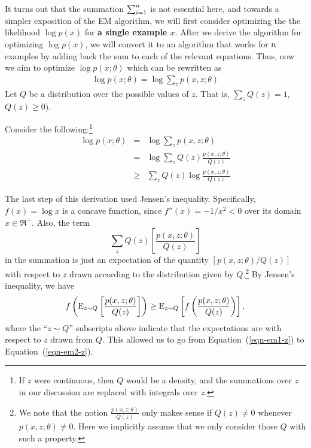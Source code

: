 \documentclass{article}
\begin{document}
It turns out that the summation $\sum_{i=1}^{n}$ is not essential here, and towards a simpler exposition of the EM algorithm, we will first consider optimizing the the likelihood $\log p(x)$ for {\bf a single example $x$}. After we derive the algorithm for optimizing $\log p(x)$, we will convert it to an algorithm that works for ${n}$ examples by adding back the sum to each of the relevant equations. Thus, now we aim to optimize $\log p(x;\theta)$ which can be rewritten as
\begin{align}
\log p(x;\theta) = \log \sum_z p(x,z; \theta)
\end{align}
Let $Q$ be a distribution over the possible values of $z$.  That is, $\sum_z Q(z) = 1$, $Q(z) \geq 0$). 

Consider the following:\footnote{If $z$ were continuous, then $Q$
	would be a density, and the summations over $z$ in our discussion
	are replaced with integrals over $z$.}
\begin{eqnarray}
\log p(x; \theta)
&=&  \log \sum_{z} p(x, z; \theta) \nonumber\\
&=& \log \sum_{z} Q(z) \frac{p(x, z; \theta)}{Q(z)} \label{eqn-em1-z}\\
&\geq&  \sum_{z} Q(z) \log \frac{p(x, z; \theta)}{Q(z)} \label{eqn-em2-z}
\end{eqnarray}



The last step of this derivation used Jensen's inequality.  Specifically,
$f(x) = \log x$ is a concave function, since $f''(x) = -1/x^2 < 0$ over its
domain $x \in \Re^+$.  Also, the term
\[
\sum_{z} Q(z) \left[\frac{p(x, z; \theta)}{Q(z)}\right]
\]
in the summation is just an expectation of the quantity
$\left[p(x, z; \theta)/Q(z)\right]$ with respect to $z$
drawn according to the distribution given by $Q$.\footnote{We note that the notion $\frac{p(x, z; \theta)}{Q(z)}$ only makes sense if $Q(z) \neq 0$ whenever $p(x,z;\theta)\neq 0$. Here we implicitly assume that we only consider those $Q$ with such a property.}
By Jensen's inequality, we have
\[
f\left({\rm E}_{z \sim Q}
\left[
\frac{p(x, z; \theta)}{Q(z)}\right] \right)
\geq
{\rm E}_{z \sim Q}
\left[
f\left(
\frac{p(x, z; \theta)}{Q(z)}\right) \right],
\]
where the ``$z \sim Q$'' subscripts above indicate that the expectations
are with respect to $z$ drawn from $Q$.
This allowed us to go from Equation~(\ref{eqn-em1-z}) to
Equation~(\ref{eqn-em2-z}).
\end{document}
